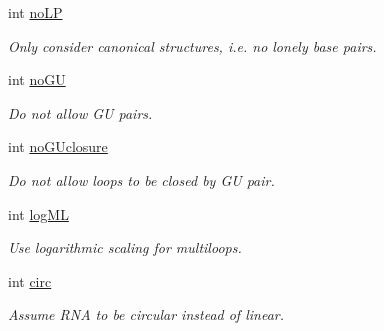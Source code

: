 \begin{DoxyCompactItemize}
\mbox{\label{structvrna__md__s_a753200bf21cee0ea2df64afe43999f5d}} 
int \mbox{\hyperlink{structvrna__md__s_a753200bf21cee0ea2df64afe43999f5d}{no\+LP}}
\begin{DoxyCompactList}\small\item\em Only consider canonical structures, i.\+e. no \textquotesingle{}lonely\textquotesingle{} base pairs. \end{DoxyCompactList}\item 
\mbox{\label{structvrna__md__s_ad64a5eaf9c4550e7525b36a725fec4b2}} 
int \mbox{\hyperlink{structvrna__md__s_ad64a5eaf9c4550e7525b36a725fec4b2}{no\+GU}}
\begin{DoxyCompactList}\small\item\em Do not allow GU pairs. \end{DoxyCompactList}\item 
\mbox{\label{structvrna__md__s_a7e883db1f33f8f3baa5c9b140350c78e}} 
int \mbox{\hyperlink{structvrna__md__s_a7e883db1f33f8f3baa5c9b140350c78e}{no\+G\+Uclosure}}
\begin{DoxyCompactList}\small\item\em Do not allow loops to be closed by GU pair. \end{DoxyCompactList}\item 
\mbox{\label{structvrna__md__s_ae259f89a94acae0c7f1412603e7f57b5}} 
int \mbox{\hyperlink{structvrna__md__s_ae259f89a94acae0c7f1412603e7f57b5}{log\+ML}}
\begin{DoxyCompactList}\small\item\em Use logarithmic scaling for multiloops. \end{DoxyCompactList}\item 
\mbox{\label{structvrna__md__s_a92762e1008503d4623ff5c01e358a464}} 
int \mbox{\hyperlink{structvrna__md__s_a92762e1008503d4623ff5c01e358a464}{circ}}
\begin{DoxyCompactList}\small\item\em Assume R\+NA to be circular instead of linear. \end{DoxyCompactList}\item 
\mbox{\label{structvrna__md__s_af88a511a2b1f526b4c6213de6cb8fd6e}} 

\end{DoxyCompactItemize}
